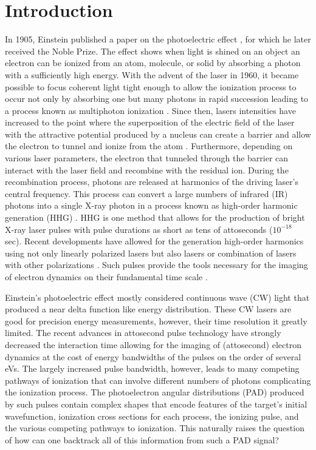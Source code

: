 \chapter{Introduction}
\label{cha:introchap}

In 1905, Einstein published a paper on the photoelectric effect \cite{einstein1905}, for which he later received the Noble Prize. The effect shows when light is shined on an object an electron can be ionized from an atom, molecule, or solid by absorbing a photon with a sufficiently high energy. With the advent of the laser in 1960, it became possible to focus coherent light tight enough to allow the ionization process to occur not only by absorbing one but many photons in rapid succession leading to a process known as multiphoton ionization \cite{goppertmayer1931}. Since then, lasers intensities have increased to the point where the superposition of the electric field of the laser with the attractive potential produced by a nucleus can create a barrier and allow the electron to tunnel and ionize from the atom \cite{keldysh1965}. Furthermore, depending on various laser parameters, the electron that tunneled through the barrier can interact with the laser field and recombine with the residual ion. During the recombination process, photons are released at harmonics of the driving laser's central frequency. This process can convert a large numbers of infrared (IR) photons into a single X-ray photon in a process known as high-order harmonic generation (HHG) \cite{franken1961,lewenstein1994,corkum1994}. HHG is one method that allows for the production of bright X-ray laser pulses with pulse durations as short as tens of attoseconds \cite{zhao2012,chen2014} ($10^{-18}$ sec). Recent developments have allowed for the generation high-order harmonics using not only linearly polarized lasers but also lasers or combination of lasers with other polarizations \cite{fleischer2014,pisanty2014,kfir2015,fan2015,hickstein2015}. Such pulses provide the tools necessary for the imaging of electron dynamics on their fundamental time scale \cite{krausz2009}. 

Einstein's photoelectric effect mostly considered continuous wave (CW) light that produced a near delta function like energy distribution. These CW lasers are good for precision energy measurements, however, their time resolution it greatly limited. The recent advances in attosecond pulse technology have strongly decreased the interaction time allowing for the imaging of (attosecond) electron dynamics at the cost of energy bandwidths of the pulses on the order of several eVs. The largely increased pulse bandwidth, however, leads to many competing pathways of ionization that can involve different numbers of photons complicating the ionization process. The photoelectron angular distributions (PAD) produced by such pulses contain complex shapes that encode features of the target's initial wavefunction, ionization cross sections for each process, the ionizing pulse, and the various competing pathways to ionization. This naturally raises the question of how can one backtrack all of this information from such a PAD signal?

